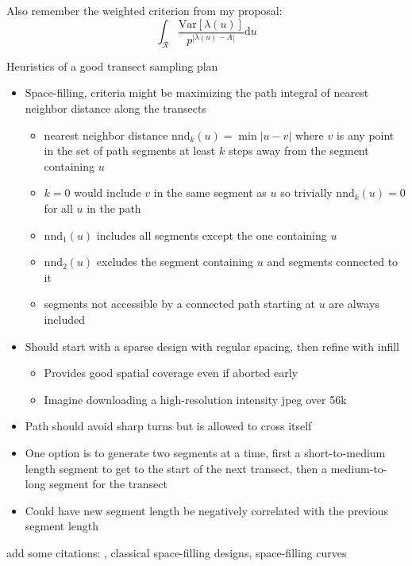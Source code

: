 \documentclass[review]{elsarticle}
\begin{document}
Also remember the weighted criterion from my proposal:
\begin{equation*}
\int_{\mathcal{R}} \frac{\mathrm{Var}\left[\lambda(u)\right]}
{p^{\left|\lambda(u)-A\right|}} \mathrm{d}u
\end{equation*}

Heuristics of a good transect sampling plan
\begin{itemize}
\item Space-filling, criteria might be maximizing the path integral of nearest
neighbor distance along the transects
\begin{itemize}
\item nearest neighbor distance \(\mathrm{nnd}_{k}(u) = \min|u - v|\) where
\(v\) is any point in the set of path segments at least \(k\) steps away from
the segment containing \(u\)
\item \(k = 0\) would include \(v\) in the same segment as \(u\) so trivially
\(\mathrm{nnd}_{k}(u) = 0\) for all \(u\) in the path
\item \(\mathrm{nnd}_{1}(u)\) includes all segments except the one containing \(u\)
\item \(\mathrm{nnd}_{2}(u)\) excludes the segment containing \(u\) and segments
connected to it
\item segments not accessible by a connected path starting at \(u\) are always
included
\end{itemize}
\item Should start with a sparse design with regular spacing, then refine with
infill
\begin{itemize}
\item Provides good spatial coverage even if aborted early
\item Imagine downloading a high-resolution intensity jpeg over 56k
\end{itemize}
\item Path should avoid sharp turns but is allowed to cross itself
\item One option is to generate two segments at a time, first a short-to-medium
length segment to get to the start of the next transect, then a  medium-to-long
segment for the transect
\item Could have new segment length be negatively correlated with the previous
segment length
\end{itemize}

add some citations: \citet{lark}, classical space-filling designs,
space-filling curves \cite{sagan}
\end{document}
